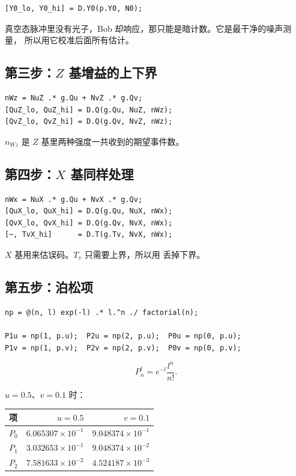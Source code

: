 \documentclass[UTF8,11pt,a4paper]{ctexart}
\newcommand{\code}[1]{\texttt{\detokenize{#1}}}
\begin{document}
\begin{lstlisting}
[Y0_lo, Y0_hi] = D.Y0(p.Y0, N0);
\end{lstlisting}

真空态脉冲里没有光子，Bob 却响应，那只能是暗计数。它是最干净的噪声测量，
所以用它校准后面所有估计。

\subsection{第三步：$Z$ 基增益的上下界}

\begin{lstlisting}
nWz = NuZ .* g.Qu + NvZ .* g.Qv;
[QuZ_lo, QuZ_hi] = D.Q(g.Qu, NuZ, nWz);
[QvZ_lo, QvZ_hi] = D.Q(g.Qv, NvZ, nWz);
\end{lstlisting}

$n_{Wz}$ 是 $Z$ 基里两种强度一共收到的期望事件数。

\subsection{第四步：$X$ 基同样处理}

\begin{lstlisting}
nWx = NuX .* g.Qu + NvX .* g.Qv;
[QuX_lo, QuX_hi] = D.Q(g.Qu, NuX, nWx);
[QvX_lo, QvX_hi] = D.Q(g.Qv, NvX, nWx);
[~, TvX_hi]      = D.T(g.Tv, NvX, nWx);
\end{lstlisting}

$X$ 基用来估误码。$T_v$ 只需要上界，所以用 \code{~} 丢掉下界。

\subsection{第五步：泊松项}

\begin{lstlisting}
np = @(n, l) exp(-l) .* l.^n ./ factorial(n);

P1u = np(1, p.u);  P2u = np(2, p.u);  P0u = np(0, p.u);
P1v = np(1, p.v);  P2v = np(2, p.v);  P0v = np(0, p.v);
\end{lstlisting}

\begin{equation}
P_n^l=e^{-l}\frac{l^n}{n!}.
\end{equation}

$u=0.5$、$v=0.1$ 时：

\begin{center}
\begin{tabular}{@{}lrr@{}}
\toprule
项 & $u=0.5$ & $v=0.1$\\
\midrule
$P_0$ & $6.065307\times10^{-1}$ & $9.048374\times10^{-1}$\\
$P_1$ & $3.032653\times10^{-1}$ & $9.048374\times10^{-2}$\\
$P_2$ & $7.581633\times10^{-2}$ & $4.524187\times10^{-3}$\\
\bottomrule
\end{tabular}
\end{center}
\end{document}

